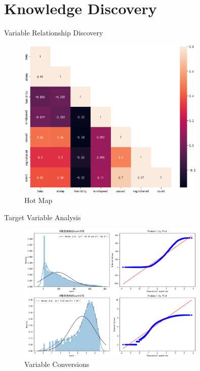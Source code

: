 \documentclass[
size=14pt,
paper=smartboard,  %
mode=present, 		%
display=slides, 	%
style=tuliplab,  	%
pauseslide,
fleqn,leqno]{powerdot}
\begin{document}
	\section{Knowledge Discovery}
	\begin{slide}{Variable Relationship Discovery}
		\begin{figure}
			\centering
			\includegraphics[width=0.8\textwidth,height=0.5\textwidth]{juzhen.eps}
			\caption{Hot Map} \label{framework}
		\end{figure}
	\end{slide}
	
	
	\begin{slide}{Target Variable Analysis}
		\begin{figure}
			\centering
			\includegraphics[width=0.8\textwidth,height=0.5\textwidth]{shift.eps}
			\caption{Variable Conversions} \label{framework}
		\end{figure}
	\end{slide}
	
\end{document}
